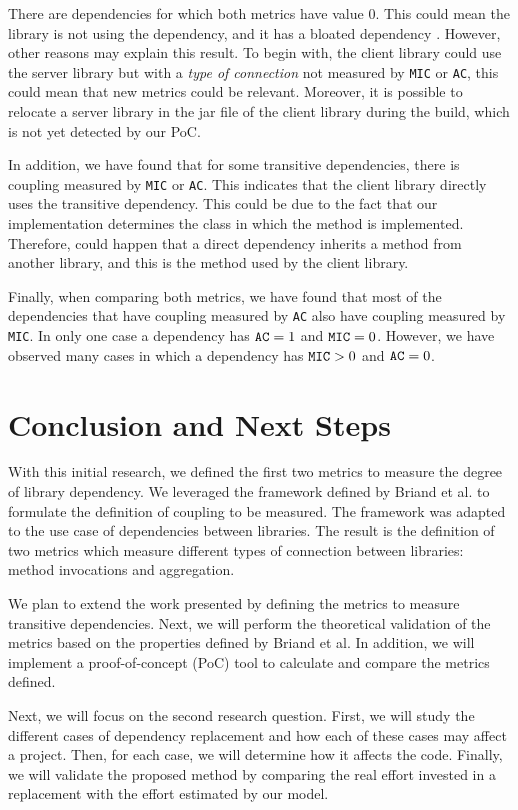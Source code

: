 \documentclass[a4paper]{article}
\begin{document}
There are dependencies for which both metrics have value 0. This could mean the library is not using the dependency, and it has a bloated dependency \cite{soto2020comprehensive}. However, other reasons may explain this result. To begin with, the client library could use the server library but with a \textit{type of connection} not measured by \texttt{MIC} or \texttt{AC}, this could mean that new metrics could be relevant. Moreover, it is possible to relocate a server library in the jar file of the client library during the build, which is not yet detected by our PoC.

In addition, we have found that for some transitive dependencies, there is coupling measured by \texttt{MIC} or \texttt{AC}. This indicates that the client library directly uses the transitive dependency. This could be due to the fact that our implementation determines the class in which the method is implemented. Therefore, could happen that a direct dependency inherits a method from another library, and this is the method used by the client library.

Finally, when comparing both metrics, we have found that most of the dependencies that have coupling measured by \texttt{AC} also have coupling measured by \texttt{MIC}. In only one case a dependency has $\verb|AC| = 1$ and $\verb|MIC| = 0$. However, we have observed many cases in which a dependency has $\verb|MIC| > 0$ and $\verb|AC| = 0$.

\section{Conclusion and Next Steps}
With this initial research, we defined the first two metrics to measure the degree of library dependency. We leveraged the framework defined by Briand et al. to formulate the definition of coupling to be measured. The framework was adapted to the use case of dependencies between libraries. The result is the definition of two metrics which measure different types of connection between libraries: method invocations and aggregation.

We plan to extend the work presented by defining the metrics to measure transitive dependencies. Next, we will perform the theoretical validation of the metrics based on the properties defined by Briand et al. In addition, we will implement a proof-of-concept (PoC) tool to calculate and compare the metrics defined.


Next, we will focus on the second research question. First, we will study the different cases of dependency replacement and how each of these cases may affect a project. Then, for each case, we will determine how it affects the code. Finally, we will validate the proposed method by comparing the real effort invested in a replacement with the effort estimated by our model.



\end{document}
